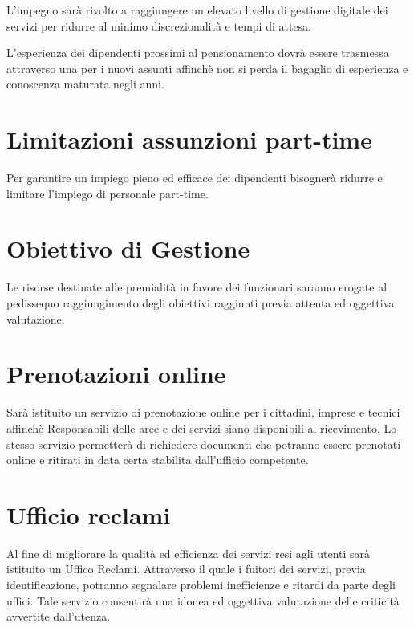 \documentclass[a4paper,14pt,italian]{sphinxmanual}
\begin{document}
L’impegno sarà rivolto a raggiungere un elevato livello di gestione digitale dei servizi per ridurre al minimo discrezionalità e tempi di attesa.

L’esperienza dei dipendenti prossimi al pensionamento dovrà essere trasmessa attraverso una  per i nuovi assunti affinchè non si perda il bagaglio di esperienza e conoscenza maturata negli anni.


\section{Limitazioni assunzioni part-time}
\label{\detokenize{comune_efficiente:limitazioni-assunzioni-part-time}}
Per garantire un impiego pieno ed efficace dei dipendenti bisognerà ridurre e limitare l’impiego di personale part-time.


\section{Obiettivo di Gestione}
\label{\detokenize{comune_efficiente:obiettivo-di-gestione}}
Le risorse destinate alle premialità in favore dei funzionari saranno erogate al pedissequo raggiungimento degli obiettivi raggiunti previa attenta ed oggettiva valutazione.


\section{Prenotazioni online}
\label{\detokenize{comune_efficiente:prenotazioni-online}}
Sarà istituito un servizio di prenotazione online per i cittadini, imprese e tecnici affinchè Responsabili delle aree e dei servizi siano disponibili al ricevimento.
Lo stesso servizio permetterà di richiedere documenti che potranno essere prenotati online e ritirati in data certa stabilita dall’ufficio competente.


\section{Ufficio reclami}
\label{\detokenize{comune_efficiente:ufficio-reclami}}
Al fine di migliorare la qualità ed efficienza dei servizi resi agli utenti sarà istituito un Uffico Reclami.
Attraverso il quale i fuitori dei servizi, previa identificazione, potranno segnalare problemi inefficienze e ritardi da parte degli uffici.
Tale servizio consentirà una idonea ed oggettiva valutazione delle criticità avvertite dall’utenza.
\end{document}
